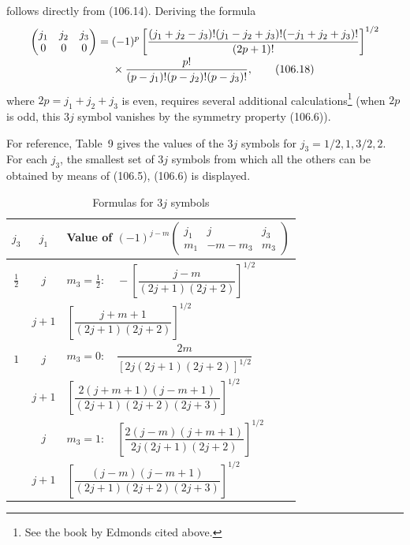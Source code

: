 follows directly from (106.14). Deriving the formula
\begin{align}
\begin{pmatrix}j_1&j_2&j_3\\0&0&0\end{pmatrix}
={}&(-1)^p\left[\frac{(j_1+j_2-j_3)!(j_1-j_2+j_3)!(-j_1+j_2+j_3)!}{(2p+1)!}\right]^{1/2}\notag\\[-2pt]
&\times\frac{p!}{(p-j_1)!(p-j_2)!(p-j_3)!},
\tag{106.18}
\end{align}
where $2p=j_1+j_2+j_3$ is even, requires several additional calculations\footnote{See the book by Edmonds cited above.} (when $2p$ is odd, this $3j$ symbol vanishes by the symmetry property (106.6)).

For reference, Table~9 gives the values of the $3j$ symbols for $j_3=1/2,1,3/2,2$. For each $j_3$, the smallest set of $3j$ symbols from which all the others can be obtained by means of (106.5), (106.6) is displayed.

\setcounter{table}{8}
\begin{table}[htbp]
\centering\small
\caption{Formulas for $3j$ symbols}
\renewcommand{\arraystretch}{1.55}
\begin{tabular}{@{}c c l@{}}
\toprule
$j_3$ & $j_1$ & \multicolumn{1}{c}{Value of $(-1)^{j-m}\begin{pmatrix}j_1&j&j_3\\m_1&-m-m_3&m_3\end{pmatrix}$}\\
\midrule
$\frac12$ & $j$ & $m_3=\frac12:\quad -\left[\dfrac{j-m}{(2j+1)(2j+2)}\right]^{1/2}$\\
 & $j+1$ & $\left[\dfrac{j+m+1}{(2j+1)(2j+2)}\right]^{1/2}$\\
\midrule
$1$ & $j$ & $m_3=0:\quad \dfrac{2m}{[2j(2j+1)(2j+2)]^{1/2}}$\\
 & $j+1$ & $\left[\dfrac{2(j+m+1)(j-m+1)}{(2j+1)(2j+2)(2j+3)}\right]^{1/2}$\\
 & $j$ & $m_3=1:\quad \left[\dfrac{2(j-m)(j+m+1)}{2j(2j+1)(2j+2)}\right]^{1/2}$\\
 & $j+1$ & $\left[\dfrac{(j-m)(j-m+1)}{(2j+1)(2j+2)(2j+3)}\right]^{1/2}$\\
\bottomrule
\end{tabular}
\end{table}

